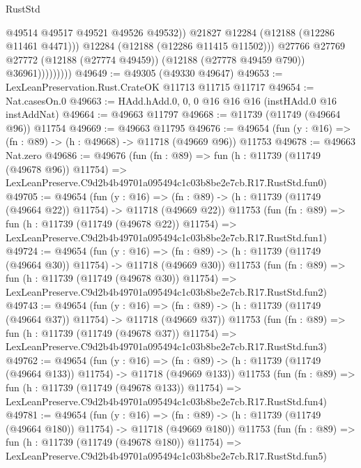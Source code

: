 \begin{lexlean}{RustStd}
\begin{coremodule}
                              @49514
                              @49517
                              @49521
                              @49526
                              @49532))
                          @21827
                          @12284
                          (@12188 (@12286 @11461 @4471)))
                        @12284
                        (@12188 (@12286 @11415 @11502)))
                      @27766
                      @27769
                      @27772
                      (@12188 (@27774 @49459))
                      (@12188 (@27778 @49459 @790))
                      @36961)))))))))
@49649 := @49305 (@49330 @49647)
@49653 := LexLeanPreservation.Rust.CrateOK @11713 @11715 @11717
@49654 := Nat.casesOn.{0}
@49663 := HAdd.hAdd.{0, 0, 0} @16 @16 @16 (instHAdd.{0} @16 instAddNat)
@49664 := @49663 @11797
@49668 := @11739 (@11749 (@49664 @96)) @11754
@49669 := @49663 @11795
@49676 := @49654 (fun (y : @16) => (fn : @89) -> (h : @49668) -> @11718 (@49669 @96)) @11753
@49678 := @49663 Nat.zero
@49686 := @49676
    (fun (fn : @89) =>
    fun (h : @11739 (@11749 (@49678 @96)) @11754) =>
    LexLeanPreserve.C9d2b4b49701a095494c1c03b8be2e7cb.R17.RustStd.fun0)
@49705 := @49654
    (fun (y : @16) =>
    (fn : @89) -> (h : @11739 (@11749 (@49664 @22)) @11754) -> @11718 (@49669 @22))
    @11753
    (fun (fn : @89) =>
    fun (h : @11739 (@11749 (@49678 @22)) @11754) =>
    LexLeanPreserve.C9d2b4b49701a095494c1c03b8be2e7cb.R17.RustStd.fun1)
@49724 := @49654
    (fun (y : @16) =>
    (fn : @89) -> (h : @11739 (@11749 (@49664 @30)) @11754) -> @11718 (@49669 @30))
    @11753
    (fun (fn : @89) =>
    fun (h : @11739 (@11749 (@49678 @30)) @11754) =>
    LexLeanPreserve.C9d2b4b49701a095494c1c03b8be2e7cb.R17.RustStd.fun2)
@49743 := @49654
    (fun (y : @16) =>
    (fn : @89) -> (h : @11739 (@11749 (@49664 @37)) @11754) -> @11718 (@49669 @37))
    @11753
    (fun (fn : @89) =>
    fun (h : @11739 (@11749 (@49678 @37)) @11754) =>
    LexLeanPreserve.C9d2b4b49701a095494c1c03b8be2e7cb.R17.RustStd.fun3)
@49762 := @49654
    (fun (y : @16) =>
    (fn : @89) -> (h : @11739 (@11749 (@49664 @133)) @11754) -> @11718 (@49669 @133))
    @11753
    (fun (fn : @89) =>
    fun (h : @11739 (@11749 (@49678 @133)) @11754) =>
    LexLeanPreserve.C9d2b4b49701a095494c1c03b8be2e7cb.R17.RustStd.fun4)
@49781 := @49654
    (fun (y : @16) =>
    (fn : @89) -> (h : @11739 (@11749 (@49664 @180)) @11754) -> @11718 (@49669 @180))
    @11753
    (fun (fn : @89) =>
    fun (h : @11739 (@11749 (@49678 @180)) @11754) =>
    LexLeanPreserve.C9d2b4b49701a095494c1c03b8be2e7cb.R17.RustStd.fun5)

\end{coremodule}
\end{lexlean}

